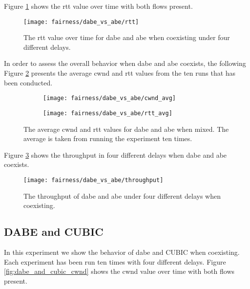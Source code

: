 Figure \ref{fig:dabe_and_abe_rtt} shows the \gls{rtt} value over time with both flows present.

\begin{figure}[H]
    \centering
    \texttt{[image: fairness/dabe\_vs\_abe/rtt]}
    \captionsetup{width=1.0\linewidth}
    \caption{The \gls{rtt} value over time for \gls{dabe} and \gls{abe} when coexisting under four different delays.}
    \label{fig:dabe_and_abe_rtt}
\end{figure}

In order to assess the overall behavior when \gls{dabe} and \gls{abe} coexists, the following Figure \ref{fig:dabe_and_abe_avg} presents the average \gls{cwnd} and \gls{rtt} values from the ten runs that has been conducted.

\begin{figure}[H]
    \centering
    \begin{subfigure}{0.5\linewidth}
        \centering
        \texttt{[image: fairness/dabe\_vs\_abe/cwnd\_avg]}
    \end{subfigure}%
    \begin{subfigure}{0.5\linewidth}
        \centering
        \texttt{[image: fairness/dabe\_vs\_abe/rtt\_avg]}
    \end{subfigure}
    \caption{The average \gls{cwnd} and \gls{rtt} values for \gls{dabe} and \gls{abe} when mixed. The average is taken from running the experiment ten times.}
    \label{fig:dabe_and_abe_avg}
\end{figure}

Figure \ref{fig:dabe_and_abe_throughput} shows the throughput in four different delays when \gls{dabe} and \gls{abe} coexists.

\begin{figure}[H]
    \centering
    \texttt{[image: fairness/dabe\_vs\_abe/throughput]}
    \captionsetup{width=1.0\linewidth}
    \caption{The throughput of \gls{dabe} and \gls{abe} under four different delays when coexisting.}
    \label{fig:dabe_and_abe_throughput}
\end{figure}






\subsection{DABE and CUBIC}

In this experiment we show the behavior of \gls{dabe} and CUBIC when coexisting. Each experiment has been run ten times with four different delays. Figure \ref{fig:dabe_and_cubic_cwnd} shows the \gls{cwnd} value over time with both flows present.

